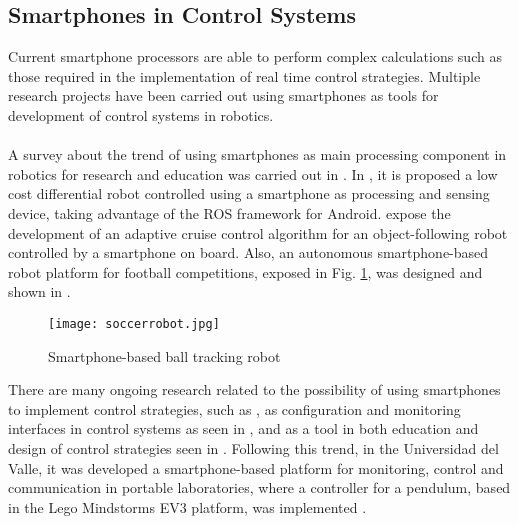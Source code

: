 \subsection{Smartphones in Control Systems}
Current smartphone processors are able to perform complex calculations such as those required in the implementation of real time control strategies. Multiple research projects have been carried out using smartphones as tools for development of control systems in robotics.
\\\\
A survey about the trend of using smartphones as main processing component in robotics for research and education was carried out in \cite{Oros2013a}.
In \cite{DeABarbosa2015}, it is proposed a low cost differential robot controlled using a smartphone as processing and sensing device, taking advantage of the ROS framework for Android. \cite{Gunawan2014} expose the development of an adaptive cruise control algorithm for an object-following robot controlled by a smartphone on board. Also, an autonomous smartphone-based robot platform for football competitions, exposed in Fig. \ref{fig:soccer}, was designed and shown in \cite{Tetzlaff2013}.
\begin{figure}[H]
\begin{center}
\texttt{[image: soccerrobot.jpg]}    
\caption[Smartphone-based ball tracking robot]{Smartphone-based ball tracking robot \protect\footnotemark} 
\label{fig:soccer}
\end{center}
\end{figure}
There are many ongoing research related to the possibility of using smartphones to implement control strategies, such as \cite{Drumea2013a}, as configuration and monitoring interfaces in control systems as seen in \cite{Lin2014a,Truong2012a, Lu2017}, and as a tool in both education and design of control strategies seen in \cite{Aristizabal2014a,WuWu2013a}. Following this trend, in the Universidad del Valle, it was developed a smartphone-based platform for monitoring, control and communication in portable laboratories, where a controller for a pendulum, based in the Lego Mindstorms EV3 platform, was implemented \cite {GarciaTellez2015}.


